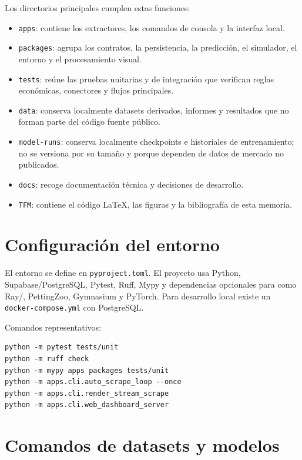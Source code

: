 Los directorios principales cumplen estas funciones:

\begin{itemize}
  \item \texttt{apps}: contiene los extractores, los comandos de consola y la interfaz local.
  \item \texttt{packages}: agrupa los contratos, la persistencia, la predicción, el simulador, el entorno  y el procesamiento visual.
  \item \texttt{tests}: reúne las pruebas unitarias y de integración que verifican reglas económicas, conectores y flujos principales.
  \item \texttt{data}: conserva localmente datasets derivados, informes y resultados que no forman parte del código fuente público.
  \item \texttt{model-runs}: conserva localmente checkpoints e historiales de entrenamiento; no se versiona por su tamaño y porque dependen de datos de mercado no publicados.
  \item \texttt{docs}: recoge documentación técnica y decisiones de desarrollo.
  \item \texttt{TFM}: contiene el código \LaTeX{}, las figuras y la bibliografía de esta memoria.
\end{itemize}

\section{Configuración del entorno}

El entorno se define en \texttt{pyproject.toml}. El proyecto usa Python, Supabase/PostgreSQL, Pytest, Ruff, Mypy y dependencias opcionales para  como Ray/, PettingZoo, Gymnasium y PyTorch. Para desarrollo local existe un \texttt{docker-compose.yml} con PostgreSQL.

Comandos representativos:

\begin{verbatim}
python -m pytest tests/unit
python -m ruff check
python -m mypy apps packages tests/unit
python -m apps.cli.auto_scrape_loop --once
python -m apps.cli.render_stream_scrape
python -m apps.cli.web_dashboard_server
\end{verbatim}

\section{Comandos de datasets y modelos}

